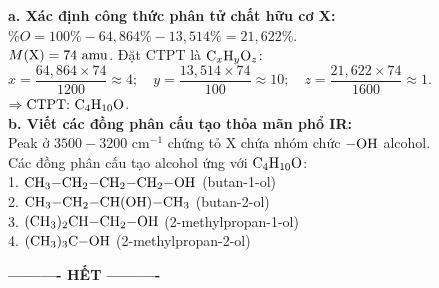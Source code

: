 \documentclass[11pt,a4paper]{article}
\begin{document}
\begin{tcolorbox}[colback=tableGreen!30,colframe=mainGreen!70,title=\textbf{Hướng dẫn giải chi tiết Câu 2},fonttitle=\bfseries]
\textbf{a. Xác định công thức phân tử chất hữu cơ X:}\\
$\%O = 100\% - 64,864\% - 13,514\% = 21,622\%$.\\
$M(\ce{X}) = 74\text{ amu}$. Đặt CTPT là $\ce{C_xH_yO_z}$:\\
$x = \dfrac{64,864 \times 74}{1200} \approx 4;\quad y = \dfrac{13,514 \times 74}{100} \approx 10;\quad z = \dfrac{21,622 \times 74}{1600} \approx 1$.\\
$\Rightarrow \text{CTPT: } \mathbf{\ce{C4H10O}}$.\\[4pt]
\textbf{b. Viết các đồng phân cấu tạo thỏa mãn phổ IR:}\\
Peak ở $3500 - 3200\text{ cm}^{-1}$ chứng tỏ X chứa nhóm chức $-\ce{OH}$ alcohol.\\
Các đồng phân cấu tạo alcohol ứng với $\ce{C4H10O}$:\\
1. $\ce{CH3-CH2-CH2-CH2-OH}$ (butan-1-ol)\\
2. $\ce{CH3-CH2-CH(OH)-CH3}$ (butan-2-ol)\\
3. $\ce{(CH3)2CH-CH2-OH}$ (2-methylpropan-1-ol)\\
4. $\ce{(CH3)3C-OH}$ (2-methylpropan-2-ol)
\end{tcolorbox}

\vspace{8pt}
\begin{center}
\textbf{---------- HẾT ----------}
\end{center}
\end{document}
